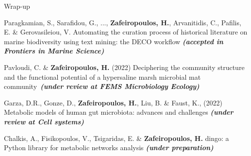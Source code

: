 \documentclass{beamer}
\begin{document}
\begin{frame}[label=bibliography]{Wrap-up}
\begin{thebibliography}{9}
         \tiny 
         Paragkamian, S., Sarafidou, G., ..., \textbf{Zafeiropoulos, H.}, Arvanitidis, C., Pafilis, E. \& Gerovasileiou, V. 
         Automating the curation process of historical literature on marine biodiversity using text mining: the DECO workflow \textbf{\textit{(accepted in Frontiers in Marine Science)}}

         \tiny	
         Pavloudi, C. \& \textbf{Zafeiropoulos, H.} (2022) Deciphering the community structure and the functional potential of a hypersaline marsh microbial mat community~\textbf{\textit{(under review at FEMS Microbiology Ecology)}}

         \tiny
         Garza, D.R., Gonze, D., \textbf{Zafeiropoulos, H.}, Liu, B. \& Faust, K., (2022) Metabolic models of human gut microbiota: advances and challenges \textbf{\textit{(under review at Cell systems)}} 

         \tiny
         Chalkis, A., Fisikopoulos, V., Tsigaridas, E. \& \textbf{Zafeiropoulos, H.} dingo: a Python library for metabolic networks analysis \textit{\textbf{(under preparation)}}

      \end{thebibliography}

   \end{frame}

\end{document}

